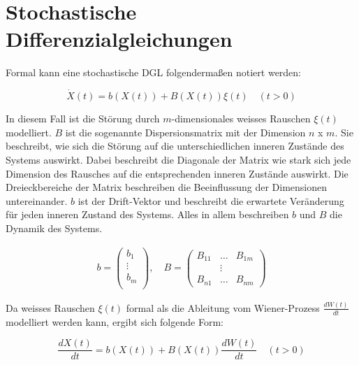 %
%
%
%

\section{Stochastische Differenzialgleichungen\label{brown:SDGL}}

Formal kann eine stochastische DGL folgendermaßen notiert werden: 

\begin{equation}
	\label{brown:SDGL:whiteNoise}
	\dot{X}(t) = b(X(t)) + B(X(t))\xi(t) \quad (t>0)
\end{equation}

In diesem Fall ist die Störung durch $ m $-dimensionales weisses Rauschen $ \xi(t) $ modelliert. $ B $ ist die sogenannte Dispersionsmatrix mit der Dimension $ n $ x $ m $. Sie beschreibt, wie sich die Störung auf die unterschiedlichen inneren Zustände des Systems auswirkt. Dabei beschreibt die Diagonale der Matrix wie stark sich jede Dimension des Rausches auf die entsprechenden inneren Zustände auswirkt. Die Dreieckbereiche der Matrix beschreiben die Beeinflussung der Dimensionen untereinander. $ b $ ist der Drift-Vektor und beschreibt die erwartete Veränderung für jeden inneren Zustand des Systems. Alles in allem beschreiben $ b $ und $ B $ die Dynamik des Systems. 

\begin{align*}
	b = 
	\begin{pmatrix}
		b_{1} \\
		\vdots \\
		b_{m}\\ 
	\end{pmatrix}
	, \quad
	B = 
	\begin{pmatrix}
		B_{11} & \dots & B_{1m} \\
		& \vdots & \\
		B_{n1} & \dots & B_{nm} 
	\end{pmatrix}
\end{align*}


Da weisses Rauschen $ \xi(t) $ formal als die Ableitung vom Wiener-Prozess $ \frac{dW(t)}{dt} $ modelliert werden kann, ergibt sich folgende Form:

\begin{equation}
	\frac{dX(t)}{dt} = b(X(t)) + B(X(t)) \frac{dW(t)}{dt} \quad (t>0)
\end{equation}

